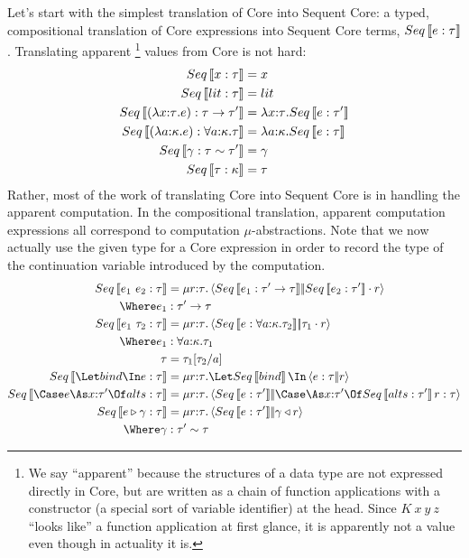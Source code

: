 \documentclass{article}
\begin{document}
Let's start with the simplest translation of Core into Sequent Core: a typed,
compositional translation of Core expressions into Sequent Core terms,
$Seq\left\llbracket{e: \tau}\right\rrbracket$.  Translating apparent%
\footnote{We say ``apparent'' because the structures of a data type are not
  expressed directly in Core, but are written as a chain of function
  applications with a constructor (a special sort of variable identifier) at the
  head.  Since $K~x~y~z$ ``looks like'' a function application at first glance,
  it is apparently not a value even though in actuality it is.}
values from Core is not hard:
\begin{align*}
  Seq\left\llbracket{x : \tau}\right\rrbracket &= x
  \\
  Seq\left\llbracket{lit: \tau}\right\rrbracket &= lit
  \\
  Seq\left\llbracket{(\lambda{x{:}{\tau}}. e) : \tau\to \tau'}\right\rrbracket
  &=
  \lambda{x{:}{\tau}}. Seq\left\llbracket{e: \tau'}\right\rrbracket
  \\
  Seq\left\llbracket{(\lambda{a{:}{\kappa}}. e) : \forall a{:}{\kappa}. \tau}\right\rrbracket
  &=
  \lambda{a{:}{\kappa}}. Seq\left\llbracket{e: \tau}\right\rrbracket
  \\
  Seq\left\llbracket{\gamma: \tau\sim \tau'}\right\rrbracket &= \gamma
  \\
  Seq\left\llbracket{\tau: \kappa}\right\rrbracket &= \tau
\end{align*}
Rather, most of the work of translating Core into Sequent Core is in handling
the apparent computation.  In the compositional translation, apparent
computation expressions all correspond to computation $\mu$-abstractions.  Note
that we now actually use the given type for a Core expression in order to record
the type of the continuation variable introduced by the computation.
\begin{align*}
  Seq\trans{\expr_1 ~ \expr_2 : \ty}
  &=
  \comp{\ann r \ty}
    \cut
    {Seq\trans{\expr_1 : \ty' \to \ty}}
    {\app{Seq\trans{\expr_2 : \ty'}}{r}}
  \\
  \Where
    \expr_1 &: \ty' \to \ty
  \\
  Seq\trans{\expr_1 ~ \ty_2 : \ty}
  &=
  \comp{\ann{r}{\ty}}
    \cut
    {Seq\trans{\expr : \forall \ann a \ki. \ty_2}}
    {\app{\ty_1}{r}}
  \\
  \Where
    \expr_1 &: \forall \ann a \ki. \ty_1
  \\
    \ty &= \ty_1[\ty_2/a]
  \\
  Seq\trans{\Let \abind \In \expr : \ty}
  &=
  \comp{\ann r \ty}\Let Seq\trans{\abind} \In \cut{\expr : \ty}{r}
  \\
  Seq\trans{\Case \expr \As \ann{x}{\ty'} \Of \alts : \ty}
  &=
  \comp{\ann{r}{\ty}}
    \cut
    {Seq\trans{\expr : \ty'}}
    {\caseas{\ann{x}{\ty'}}{Seq\trans{\alts : \ty'}{r:\ty}}}
  \\
  Seq\trans{\coerce{\expr}{\cn} : \ty}
  &=
  \comp{\ann{r}{\ty}}\cut{Seq\trans{\expr : \ty'}}{\koerce{\cn}{r}}
  \\
  \Where
    \cn &: \eqty{\ty'}{\ty}
\end{align*}
\end{document}
